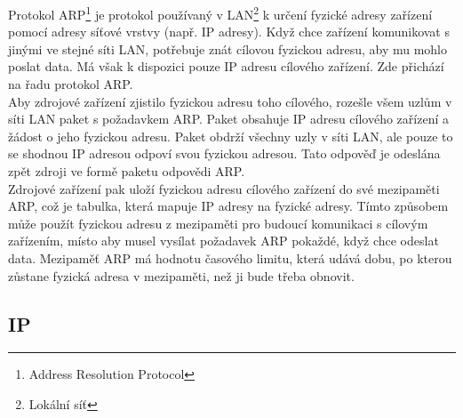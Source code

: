 \documentclass[12pt]{report}			%
\begin{document}
				
Protokol ARP\footnote{Address Resolution Protocol} je protokol používaný v LAN\footnote{Lokální síť} k určení fyzické adresy zařízení pomocí adresy síťové vrstvy (např. IP adresy). Když chce zařízení komunikovat s jinými ve stejné síti LAN, potřebuje znát cílovou fyzickou adresu, aby mu mohlo poslat data. Má však k dispozici pouze IP adresu cílového zařízení. Zde přichází na řadu protokol ARP.
\\
Aby zdrojové zařízení zjistilo fyzickou adresu toho cílového, rozešle všem uzlům v síti LAN paket s požadavkem ARP. Paket obsahuje IP adresu cílového zařízení a žádost o jeho fyzickou adresu. Paket obdrží všechny uzly v síti LAN, ale pouze to se shodnou IP adresou odpoví svou fyzickou adresou. Tato odpověď je odeslána zpět zdroji ve formě paketu odpovědi ARP.
\\
Zdrojové zařízení pak uloží fyzickou adresu cílového zařízení do své mezipaměti ARP, což je tabulka, která mapuje IP adresy na fyzické adresy. Tímto způsobem může použít fyzickou adresu z mezipaměti pro budoucí komunikaci s cílovým zařízením, místo aby musel vysílat požadavek ARP pokaždé, když chce odeslat data. Mezipaměť ARP má hodnotu časového limitu, která udává dobu, po kterou zůstane fyzická adresa v mezipaměti, než ji bude třeba obnovit.\cite{arp1}\cite{arp2}\cite{arp3}

				\subsection{IP}
				
\end{document}
